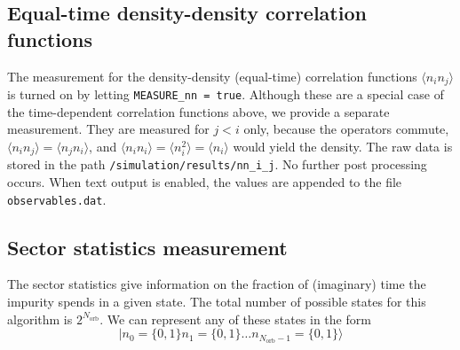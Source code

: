 \documentclass[aps,prb,floatfix,superscriptaddress,twocolumn,notitlepage]{revtex4-1}
\begin{document}
\subsection{Equal-time density-density correlation functions}

The measurement for the density-density (equal-time) correlation functions $\langle n_{i}n_{j}\rangle$ is turned on by letting \verb#MEASURE_nn = true#. Although these are a special case of the time-dependent correlation functions above, we provide a separate measurement.
They are measured for $j<i$ only, because the operators commute, $\langle n_{i}n_{j}\rangle=\langle n_{j}n_{i}\rangle$,  and $\langle n_{i}n_{i}\rangle = \langle n^{2}_{i}\rangle = \langle n_{i}\rangle$ would yield the density. The raw data is stored in the path \verb#/simulation/results/nn_i_j#. No further post processing occurs. When text output is enabled, the values are appended to the file \verb#observables.dat#.

\subsection{Sector statistics measurement}
The sector statistics give information on the fraction of (imaginary) time the impurity spends in a given state. The total number of possible states for this algorithm is $2^{N_{\text{orb}}}$. 
We can represent any of these states in the form
\begin{equation}
|n_{0}=\{0,1\} n_{1}=\{0,1\}\ldots n_{N_{\text{orb}}-1}=\{0,1\}\rangle
\end{equation}
\end{document}
